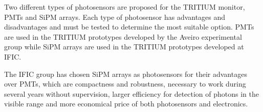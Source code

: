 Two different types of photosensors are proposed for the TRITIUM monitor, PMTs and SiPM arrays. Each type of photosensor has advantages and disadvantages and must be tested to determine the most suitable option. PMTs are used in the TRITIUM prototypes developed by the Aveiro experimental group while SiPM arrays are used in the TRITIUM prototypes developed at IFIC.


The IFIC group has chosen SiPM arrays as photosensors for their advantages over PMTs, which are compactness and robustness, necessary to work during several years without supervision, larger efficiency for detection of photons in the visible range and more economical price of both photosensors and electronics. %